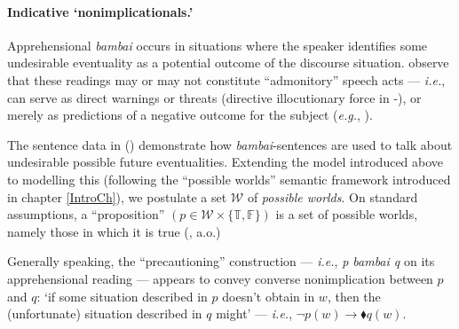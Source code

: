 \paragraph{Indicative `nonimplicationals.'}

Apprehensional \textit{bambai} occurs in situations where the speaker identifies some undesirable eventuality as a potential outcome of the discourse situation. \citet[272\textit{ff}]{Angelo2016} observe that these readings may or may not constitute ``admonitory'' speech acts --- \textit{i.e.}, can serve as direct warnings or threats (directive illocutionary force in -), or merely as predictions of a negative outcome for the subject  (\textit{e.g.}, ).

The sentence data in () demonstrate how \textit{bambai}-sentences are used to talk about undesirable possible future eventualities. Extending the model introduced above to modelling this (following the ``possible worlds'' semantic framework introduced in chapter \ref{IntroCh}), we postulate a set $\mathcal W$ of \textit{possible worlds}. On standard assumptions, a ``proposition'' $(p\in\mathcal W\times\{\mathbb{T,F}\})$ is a set of possible worlds, namely those in which it is true (\citealp[\textit{e.g.},][]{Stalnaker1976,Kripke1963,Kratzer1977}, a.o.) 

Generally speaking, the ``precautioning'' construction --- \textit{i.e.}, \textit{p bambai q} on its apprehensional reading --- appears to convey converse nonimplication between $ p $ and $ q $: `if some situation described in $p$ doesn't obtain in $w$, then the (unfortunate) situation described in $q$ might' --- \textit{i.e.}, $\neg p(w)\to\blacklozenge q(w)$.

